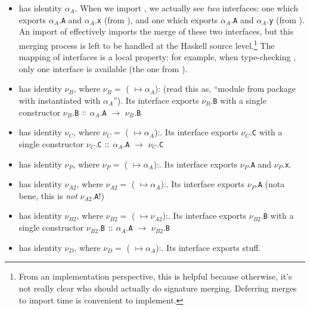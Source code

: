 \documentclass{article}
\begin{document}
\begin{itemize}
    \item {} has identity $\alpha_A$.  When we import , we
        actually see \emph{two} interfaces: one which exports
        $\alpha_{A}.$\verb|A| and $\alpha_{A}.$\verb|x| (from
        ), and one which exports $\alpha_{A}.$\verb|A| and
        $\alpha_{A}.$\verb|y| (from ).  An import of 
        effectively imports the merge of these two interfaces, but this
        merging process is left to be handled at the Haskell source
        level.\footnote{From an implementation perspective, this is
        helpful because otherwise, it's not really clear who should actually
        do signature merging.  Deferring merges to import time is convenient
    to implement.}  The mapping of
        interfaces is a local property: for example, when type-checking
        , only one interface is available (the one from
        ).
\item {} has identity $\nu_B$, where $\nu_B=$ ( $\mapsto\alpha_A$): (read this as, ``module  from package  with  instantiated with $\alpha_A$'').  Its interface exports $\nu_{B}.$\verb|B| with a single constructor $\nu_{B}.$\verb|B| $\mathop{::}$ $\alpha_{A}.$\verb|A| $\rightarrow$ $\nu_{B}.$\verb|B|
\item {} has identity $\nu_C$, where $\nu_C=$ ( $\mapsto\alpha_A$):. Its interface exports $\nu_{C}.$\verb|C| with a single constructor $\nu_{C}.$\verb|C| $\mathop{::}$ $\alpha_{A}.$\verb|A| $\rightarrow$ $\nu_{C}.$\verb|C|
\item {} has identity $\nu_P$, where $\nu_P=$ ( $\mapsto\alpha_A$):. Its interface exports $\nu_{P}.$\verb|A| and $\nu_{P}.$\verb|x|.
\item {} has identity $\nu_{A2}$, where $\nu_{A2}=$ ( $\mapsto\alpha_A$):. Its interface exports $\nu_{P}.$\verb|A| (nota bene, this is \emph{not} $\nu_{A2}.$\verb|A|!)
\item {} has identity $\nu_{B2}$, where $\nu_{B2}=$ ( $\mapsto\nu_{A2}$):. Its interface exports $\nu_{B2}.$\verb|B| with a single constructor $\nu_{B2}.$\verb|B| $\mathop{::}$ $\alpha_{A}.$\verb|A| $\rightarrow$ $\nu_{B2}.$\verb|B|
\item {} has identity $\nu_{D}$, where $\nu_{D}=$ ( $\mapsto\alpha_A$):. Its interface exports stuff.
\end{itemize}
\end{document}
